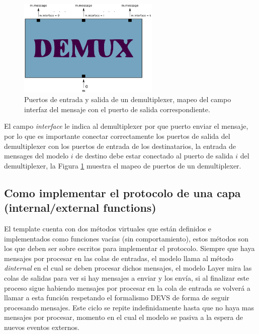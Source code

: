 \documentclass[10pt,a4paper]{article}
\begin{document}
\begin{figure}[t]
    \centering
    \includegraphics[width = 0.6\textwidth]{img/png/demultiplexer.png}
    \caption{Puertos de entrada y salida de un demultiplexer, mapeo del campo interfaz del mensaje con el puerto de salida correspondiente.}
    \label{figure: demultiplexer}
\end{figure}

El campo \textit{interface} le indica al demultiplexer por que puerto enviar el mensaje, por lo que es importante conectar correctamente los puertos de salida del demultiplexer con los puertos de entrada de los destinatarios, la entrada de mensages del modelo $i$ de destino debe estar conectado al puerto de salida $i$ del demultiplexer, la Figura \ref{figure: demultiplexer} muestra el mapeo de puertos de un demultiplexer. \\

\newpage

\subsection{Como implementar el protocolo de una capa (internal/external functions)}

El template cuenta con dos métodos virtuales que están definidos e implementados como funciones vacías (sin comportamiento), estos métodos son los que deben ser sobre escritos para implementar el protocolo. Siempre que haya mensajes por procesar en las colas de entradas, el modelo llama al método \textit{dinternal} en el cual se deben procesar dichos mensajes, el modelo Layer mira las colas de salidas para ver si hay mensajes a enviar y los envía, si al finalizar este proceso sigue habiendo mensajes por procesar en la cola de entrada se volverá a llamar a esta función respetando el formalismo DEVS de forma de seguir procesando mensajes. Este ciclo se repite indefinidamente hasta que no haya mas mensajes por procesar, momento en el cual el modelo se pasiva a la espera de nuevos eventos externos. \\
\end{document}
